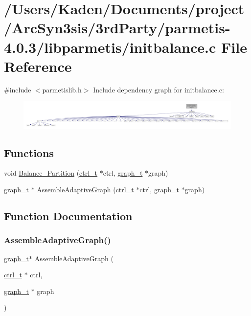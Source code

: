 \hypertarget{a00362}{}\section{/\+Users/\+Kaden/\+Documents/project/\+Arc\+Syn3sis/3rd\+Party/parmetis-\/4.0.3/libparmetis/initbalance.c File Reference}
\label{a00362}
{\ttfamily \#include $<$parmetislib.\+h$>$}\newline
Include dependency graph for initbalance.\+c\+:\nopagebreak
\begin{figure}[H]
\begin{center}
\leavevmode
\includegraphics[width=350pt]{a00363}
\end{center}
\end{figure}
\subsection*{Functions}
\begin{DoxyCompactItemize}
\item 
void \hyperlink{a00362_a7bcdd85a474ca202b55107b892a663f9}{Balance\+\_\+\+Partition} (\hyperlink{a00742}{ctrl\+\_\+t} $\ast$ctrl, \hyperlink{a00734}{graph\+\_\+t} $\ast$graph)
\item 
\hyperlink{a00734}{graph\+\_\+t} $\ast$ \hyperlink{a00362_a1bf0cf66702bc4f8de2149340294318b}{Assemble\+Adaptive\+Graph} (\hyperlink{a00742}{ctrl\+\_\+t} $\ast$ctrl, \hyperlink{a00734}{graph\+\_\+t} $\ast$graph)
\end{DoxyCompactItemize}


\subsection{Function Documentation}
\mbox{\label{a00362_a1bf0cf66702bc4f8de2149340294318b}} 
\subsubsection{\texorpdfstring{Assemble\+Adaptive\+Graph()}{AssembleAdaptiveGraph()}}
{\footnotesize\ttfamily \hyperlink{a00734}{graph\+\_\+t}$\ast$ Assemble\+Adaptive\+Graph (\begin{DoxyParamCaption}\item[{\hyperlink{a00742}{ctrl\+\_\+t} $\ast$}]{ctrl,  }\item[{\hyperlink{a00734}{graph\+\_\+t} $\ast$}]{graph }\end{DoxyParamCaption})}

